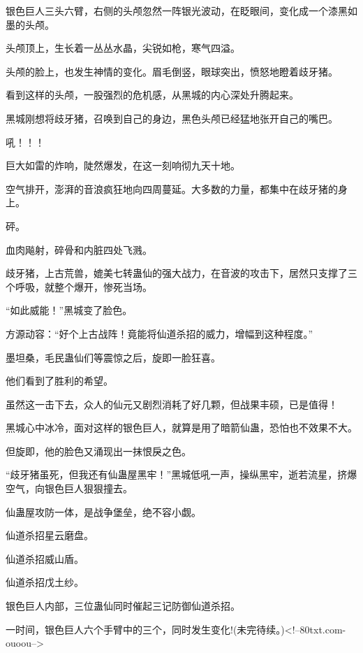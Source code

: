 \begin{this_body}
银色巨人三头六臂，右侧的头颅忽然一阵银光波动，在眨眼间，变化成一个漆黑如墨的头颅。

头颅顶上，生长着一丛丛水晶，尖锐如枪，寒气四溢。

头颅的脸上，也发生神情的变化。眉毛倒竖，眼球突出，愤怒地瞪着歧牙猪。

看到这样的头颅，一股强烈的危机感，从黑城的内心深处升腾起来。

黑城刚想将歧牙猪，召唤到自己的身边，黑色头颅已经猛地张开自己的嘴巴。

吼！！！

巨大如雷的炸响，陡然爆发，在这一刻响彻九天十地。

空气排开，澎湃的音浪疯狂地向四周蔓延。大多数的力量，都集中在歧牙猪的身上。

砰。

血肉飚射，碎骨和内脏四处飞溅。

歧牙猪，上古荒兽，媲美七转蛊仙的强大战力，在音波的攻击下，居然只支撑了三个呼吸，就整个爆开，惨死当场。

“如此威能！”黑城变了脸色。

方源动容：“好个上古战阵！竟能将仙道杀招的威力，增幅到这种程度。”

墨坦桑，毛民蛊仙们等震惊之后，旋即一脸狂喜。

他们看到了胜利的希望。

虽然这一击下去，众人的仙元又剧烈消耗了好几颗，但战果丰硕，已是值得！

黑城心中冰冷，面对这样的银色巨人，就算是用了暗箭仙蛊，恐怕也不效果不大。

但旋即，他的脸色又涌现出一抹恨戾之色。

“歧牙猪虽死，但我还有仙蛊屋黑牢！”黑城低吼一声，操纵黑牢，逝若流星，挤爆空气，向银色巨人狠狠撞去。

仙蛊屋攻防一体，是战争堡垒，绝不容小觑。

仙道杀招星云磨盘。

仙道杀招威山盾。

仙道杀招戊土纱。

银色巨人内部，三位蛊仙同时催起三记防御仙道杀招。

一时间，银色巨人六个手臂中的三个，同时发生变化!(未完待续。)<!--80txt.com-ouoou-->

\end{this_body}

